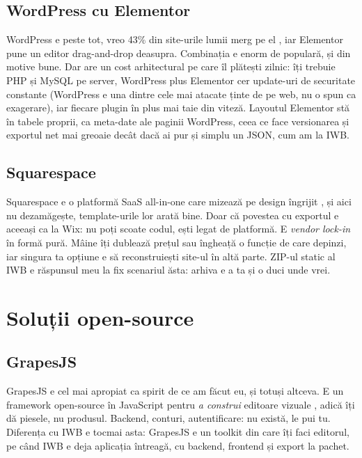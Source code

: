 \documentclass[12pt,a4paper]{report}
\begin{document}
\subsection{WordPress cu Elementor}

WordPress e peste tot, vreo 43\% din site-urile lumii merg pe el \cite{w3techs},
iar Elementor pune un editor drag-and-drop deasupra. Combinația e enorm de populară,
și din motive bune. Dar are un cost arhitectural pe care îl plătești zilnic: îți
trebuie PHP și MySQL pe server, WordPress plus Elementor cer update-uri de securitate
constante (WordPress e una dintre cele mai atacate ținte de pe web, nu o spun ca
exagerare), iar fiecare plugin în plus mai taie din viteză. Layoutul Elementor stă în
tabele proprii, ca meta-date ale paginii WordPress, ceea ce face versionarea și
exportul net mai greoaie decât dacă ai pur și simplu un JSON, cum am la IWB.

\subsection{Squarespace}

Squarespace e o platformă SaaS all-in-one care mizează pe design îngrijit
\cite{squarespace}, și aici nu dezamăgește, template-urile lor arată bine. Doar că
povestea cu exportul e aceeași ca la Wix: nu poți scoate codul, ești legat de
platformă. E \textit{vendor lock-in} în formă pură. Mâine îți dublează prețul sau
îngheață o funcție de care depinzi, iar singura ta opțiune e să reconstruiești
site-ul în altă parte. ZIP-ul static al IWB e răspunsul meu la fix scenariul ăsta:
arhiva e a ta și o duci unde vrei.

\section{Soluții open-source}

\subsection{GrapesJS}

GrapesJS e cel mai apropiat ca spirit de ce am făcut eu, și totuși altceva. E un
framework open-source în JavaScript pentru \emph{a construi} editoare vizuale
\cite{grapesjs}, adică îți dă piesele, nu produsul. Backend, conturi,
autentificare: nu există, le pui tu. Diferența cu IWB e tocmai asta: GrapesJS e un
toolkit din care îți faci editorul, pe când IWB e deja aplicația întreagă, cu backend,
frontend și export la pachet.
\end{document}

